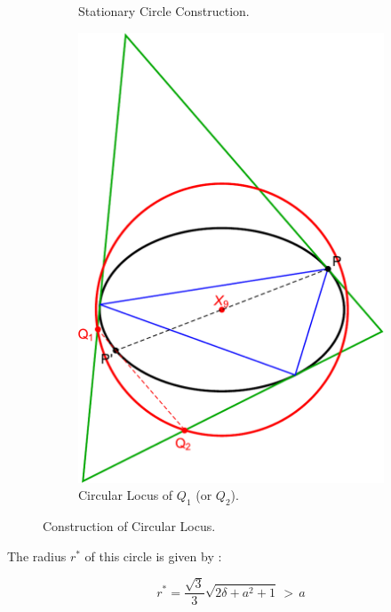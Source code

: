 \begin{figure}[H]
\begin{subfigure}[t]{0.45\textwidth}
    \caption{Stationary Circle Construction.}
    \label{fig:cosine_circle_construction}
     \end{subfigure}
     \hfill
     \begin{subfigure}[t]{0.45\textwidth}
         \centering
          \includegraphics[width=1.0\linewidth]{pics/0110_cosine_circle_locus.pdf}
         \caption{Circular Locus of $Q_1$ (or $Q_2$).}
         \label{fig:cosine_circle_locus}
     \end{subfigure}
     \caption{Construction of Circular Locus.}
\end{figure}

The radius $r^*$ of this circle is given by \cite{ronaldo19a}:

\begin{equation}
r^* = \frac{\sqrt{3}}{3}\sqrt{2\delta+a^2+1}\,>\,a
\label{eqn:rstar}
\end{equation}

